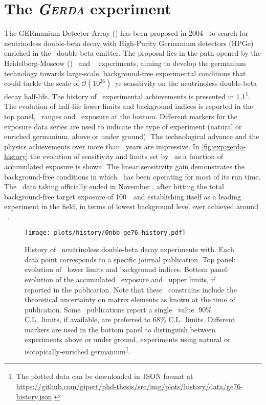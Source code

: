 
\chapter[The \gerda\ experiment]{The \textit{\textsc{Gerda}} experiment}\label{chap:gerda}

The GERmanium Detector Array (\gerda) has been proposed in 2004~\cite{gerda-proposal} to
search for neutrinoless double-beta decay with High-Purity Germanium detectors (HPGe)
enriched in the \gesix\ double-beta emitter. The proposal lies in the path opened by the
Heidelberg-Moscow (\hdm)~\cite{Klapdor2001} and \igex~\cite{Aalseth2002} experiments,
aiming to develop the germanium technology towards large-scale, background-free
experimental conditions that could tackle the scale of $\mathcal{O}(10^{26})$~yr
sensitivity on the neutrinoless double-beta decay half-life. The history of \gesix\
experimental achievements is presented in
\cref{img:exp:ge76-history}\footnote{\label{footnote:ge76-hist-json}%
  The plotted data can be downloaded in JSON format at
  \url{https://github.com/gipert/phd-thesis/src/img/plots/history/data/ge76-history.json}.
}. The evolution of half-life lower limits and background indices is reported in the top
panel, \mbb\ ranges and \gesix\ exposure at the bottom.  Different markers for the exposure
data series are used to indicate the type of experiment (natural or enriched germanium,
above or under ground).  The technological advance and the physics achievements over more
than \yr{50}~years are impressive. In \cref{fig:exp:gerda-history} the evolution of
sensitivity and limits set by \gerda\ as a function of accumulated exposure is shown. The
linear sensitivity gain demonstrates the background-free conditions in which \gerda\ has
been operating for most of its run time. The \gerda\ data taking officially ended in
November \yr{2019}, after hitting the total background-free target exposure of 100~\kgyr\
and establishing itself as a leading experiment in the field, in terms of lowest
background level ever achieved around \qbb~\cite{Kermaidic2020, Agostini2021}.

\begin{figure}
  \centering
  \texttt{[image: plots/history/0nbb-ge76-history.pdf]}
  \caption[placeholder]{%
    History of \gesix\ neutrinoless double-beta decay experiments with. Each data point
    corresponds to a specific journal publication. Top panel: evolution of \thalfzero\
    lower limits and background indices. Bottom panel: evolution of the accumulated
    \gesix\ exposure and \mbb\ upper limits, if reported in the publication. Note that
    these \mbb\ constrains include the theoretical uncertainty on matrix elements as known
    at the time of publication. Some \hdm\ publications report a single \mbb\ value. 90\%
    C.L.~limits, if available, are preferred to 68\% C.L.~limits. Different markers are
    used in the bottom panel to distinguish between experiments above or under ground,
    experiments using natural or isotopically-enriched
    germanium\textsuperscript{\ref{footnote:ge76-hist-json}}.
  }\label{img:exp:ge76-history}
\end{figure}

